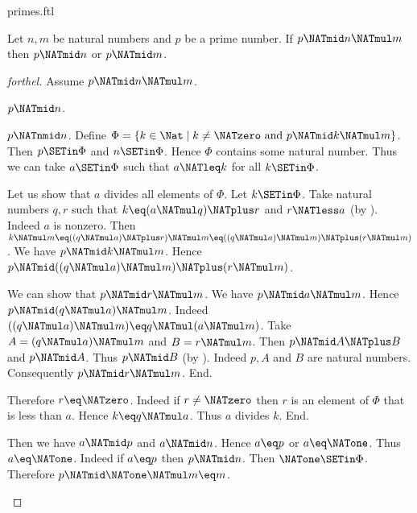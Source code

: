 \documentclass{naproche-library}
\begin{document}
\begin{smodule}[title=Prime Numbers]{primes.ftl}
\begin{proposition}[forthel,id=ARITHMETIC_10_8313676557713408]
  Let $n, m$ be natural numbers and $p$ be a prime number.
  If $p \NATmid n \NATmul m$ then $p \NATmid n$ or $p \NATmid m$.
\end{proposition}
\begin{proof}[forthel]
  Assume $p \NATmid n \NATmul m$.

  \begin{case}{$p \NATmid n$.} \end{case}

  \begin{case}{$p \NATnmid n$.}
    Define $\Phi = \{ k \in \Nat \mid k \neq \NATzero\text{ and }p \NATmid k \NATmul m \}$.
    Then $p \SETin \Phi$ and $n \SETin \Phi$.
    Hence $\Phi$ contains some natural number.
    Thus we can take $a \SETin \Phi$ such that $a \NATleq k$ for all $k \SETin \Phi$.

    Let us show that $a$ divides all elements of $\Phi$.
      Let $k \SETin \Phi$.
      Take natural numbers $q, r$ such that $k \eq (a \NATmul q) \NATplus r$ and $r \NATless a$ (by ).
      Indeed $a$ is nonzero.
      Then $k \NATmul m
        \eq ((q \NATmul a) \NATplus r) \NATmul m
        \eq ((q \NATmul a) \NATmul m) \NATplus (r \NATmul m)$.
      We have $p \NATmid k \NATmul m$.
      Hence $p \NATmid ((q \NATmul a) \NATmul m) \NATplus (r \NATmul m)$.

      We can show that $p \NATmid r \NATmul m$.
        We have $p \NATmid a \NATmul m$.
        Hence $p \NATmid (q \NATmul a) \NATmul m$.
        Indeed $((q \NATmul a) \NATmul m) \eq q \NATmul (a \NATmul m)$. %
        Take $A = (q \NATmul a) \NATmul m$ and $B = r \NATmul m$. %
        Then $p \NATmid A \NATplus B$ and $p \NATmid A$.
        Thus $p \NATmid B$ (by ).
        Indeed $p, A$ and $B$ are natural numbers.
        Consequently $p \NATmid r \NATmul m$.
      End.

      Therefore $r \eq \NATzero$.
      Indeed if $r \neq \NATzero$ then $r$ is an element of $\Phi$ that is less than $a$.
      Hence $k \eq q \NATmul a$.
      Thus $a$ divides $k$.
    End.

    Then we have $a \NATmid p$ and $a \NATmid n$.
    Hence $a \eq p$ or $a \eq \NATone$.
    Thus $a \eq \NATone$.
    Indeed if $a \eq p$ then $p \NATmid n$.
    Then $\NATone \SETin \Phi$.
    Therefore $p \NATmid \NATone \NATmul m \eq m$.
  \end{case}
\end{proof}
\end{smodule}
\end{document}
